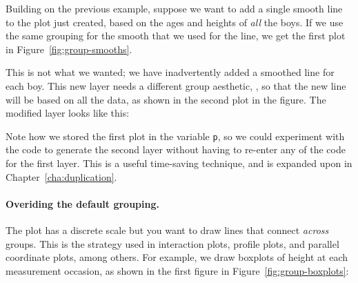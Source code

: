 Building on the previous example, suppose we want to add a single smooth line to the plot just created, based on the ages and heights of {\em all} the boys.  If we use the same grouping for the smooth that we used for the line, we get the first plot in Figure~\ref{fig:group-smooths}.  

% 


This is not what we wanted; we have inadvertently added a smoothed line for each boy. This new layer needs a different group aesthetic, , so that the new line will be based on all the data, as shown in the second plot in the figure.  The modified layer looks like this:

% 


% 

 
Note how we stored the first plot in the variable {\tt p}, so we could experiment with the code to generate the second layer without having to re-enter any of the code for the first layer.  This is a useful time-saving technique, and is expanded upon in Chapter~\ref{cha:duplication}.

\paragraph{Overiding the default grouping.}  The plot has a discrete scale but you want to draw lines that connect {\em across} groups.  This is the strategy used in interaction plots, profile plots, and parallel coordinate plots, among others.  For example, we draw boxplots of height at each measurement occasion, as shown in the first figure in Figure~\ref{fig:group-boxplots}:

% 


